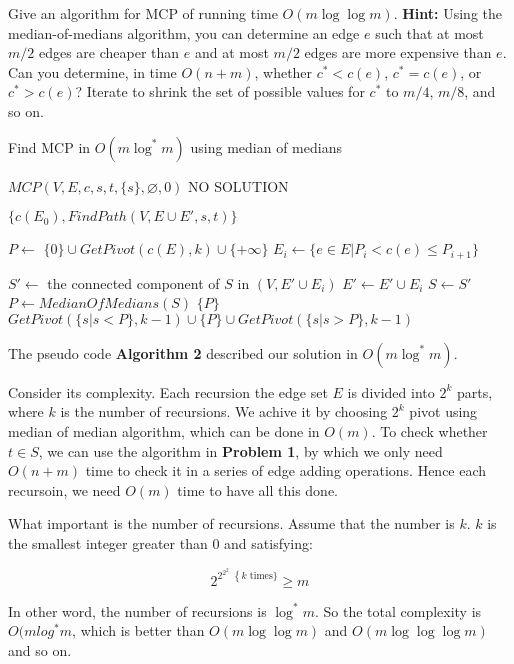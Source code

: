 \documentclass[11pt,a4paper,oneside]{article}
\begin{document}
\begin{problem}{2}
	\statement
	Give an algorithm for MCP of running time $O(m \log \log m)$. \textbf{Hint:} Using the median-of-medians algorithm,
	you can determine an edge $e$ such that at most $m/2$ edges are cheaper than $e$ and at most $m/2$ edges are
	more expensive than $e$. Can you determine, in time $O(n+m)$, whether $c^* < c(e)$, $c^* = c(e)$, or $c^* > c(e)$?
	Iterate to shrink the set of possible
	values for $c^*$ to $m/4$, $m/8$, and so on.

	\solution
	
	\begin{algorithm}
		\caption{Find MCP in $O(m \log^* m)$ using median of medians}
		\begin{algorithmic}[1]

					\State \Return $MCP(V, E, c, s, t, \{s\}, \varnothing, 0)$
				\Else
					\State \Return NO SOLUTION
				\EndIf
			\EndFunction

				\State \Return $\{c(E_0), FindPath(V, E \cup E', s, t)\}$
			\EndIf
			
			\State $P \gets$ $\{0\} \cup GetPivot(c(E), k) \cup  \{+\infty\}$ 
			\State $E_i \gets \{e \in E | P_i < c(e) \leq P_{i+1} \}$

				\State $S' \gets$ the connected component of $S$ in $(V, E' \cup E_i)$
					\State {}
				\EndIf
				\State $E' \gets E' \cup E_i$
				\State $S \gets S'$
			\EndFor
			\EndFunction
				\State $P \leftarrow MedianOfMedians(S)$
					\State \Return $\{P\}$
				\Else
					\State \Return $GetPivot(\{s | s < P\}, k - 1) \cup \{P\} \cup GetPivot(\{s | s > P\}, k - 1)$
				\EndIf
			\EndFunction
		\end{algorithmic}
	\end{algorithm}

	The pseudo code \textbf{Algorithm 2} described our solution in $O(m \log ^ * m)$.

	Consider its complexity. Each recursion the edge set \(E\) is divided into \(2^k\) parts, where \(k\) is the number of recursions. We achive it by choosing \(2^k\) pivot using median of median algorithm, which can be done in \(O(m)\). To check whether \(t \in S\), we can use the algorithm in \textbf{Problem 1}, by which we only need \(O(n+m)\) time to check it in a series of edge adding operations. Hence each recursoin, we need \(O(m)\) time to have all this done.
	
	What important is the number of recursions. Assume that the number is \(k\). \(k\) is the smallest integer greater than \(0\) and satisfying:
	
	\[2^{2^{2^{2^{\dots}}} \left\{k \text{ times} \}\right.} \geq m\]
	
	In other word, the number of recursions is \(\log^* m\). So the total complexity is \(O(mlog^*m\), which is better than \(O(m\log\log m)\) and \(O(m\log\log\log m)\) and so on.
	
\end{problem}
\end{document}
